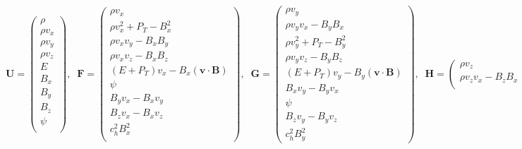 {\tiny
\begin{equation}
    \bm{ U} = \left( 
        \begin{array}{c}
            \rho \\
            \rho v_x \\
            \rho v_y \\
            \rho v_z \\
            E\\
            B_x \\
            B_y \\
            B_z \\
            \psi \\
    \end{array}
\right),\;\;
    \bm{ F} = \left( 
        \begin{array}{c}
            \rho v_x \\
            \rho v_x^2 + P_T - B_x^2 \\
            \rho v_x v_y  - B_x B_y \\
            \rho v_x v_z  - B_x B_z \\
            (E + P_T)v_x - B_x (\bm{ v}\cdot\bm{ B}) \\
            \psi \\
            B_y v_x - B_x v_y\\
            B_z v_x - B_x v_z\\
            c_h^2 B_x^2 \\
    \end{array}
\right),\;\;
    \bm{G} = \left( 
        \begin{array}{c}
            \rho v_y  \\
            \rho v_y v_x  - B_y B_x \\
            \rho v_y^2 + P_T - B_y^2 \\
            \rho v_y v_z  - B_y B_z \\
            (E + P_T)v_y - B_y (\bm{ v}\cdot\bm{ B}) \\
            B_x v_y - B_y v_x\\
            \psi \\
            B_z v_y - B_y v_z\\
            c_h^2 B_y^2 
    \end{array}
\right),\;\;
    \bm{H} = \left( 
        \begin{array}{c}
            \rho v_z  \\
            \rho v_z v_x  - B_z B_x \\

\end{array}
\end{equation}}
